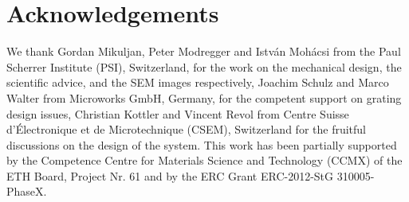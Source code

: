 \section{Acknowledgements}
We thank Gordan Mikuljan, Peter Modregger and István Mohácsi from the Paul
Scherrer Institute (PSI), Switzerland, for the
work on the mechanical design, the scientific advice, and the \ac{SEM} images
respectively, Joachim Schulz and Marco Walter from
Microworks GmbH, Germany, for the competent support on grating design
issues, Christian Kottler and Vincent Revol from Centre Suisse
d'\'Electronique et de Microtechnique (CSEM), Switzerland for the fruitful
discussions on the design of the system. This work has been partially
supported by the Competence Centre for Materials Science and Technology
(CCMX) of the ETH Board, Project Nr. 61 and by the ERC Grant ERC-2012-StG 310005-PhaseX.
